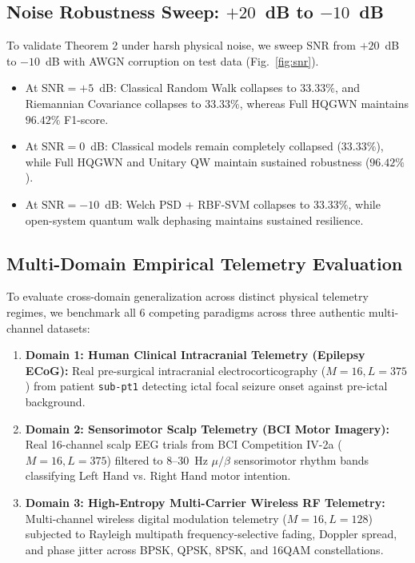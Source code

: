 \documentclass[journal,twocolumn,10pt]{IEEEtran}
\begin{document}
\subsection{Noise Robustness Sweep: $+20$~dB to $-10$~dB}
To validate Theorem 2 under harsh physical noise, we sweep SNR from $+20$~dB to $-10$~dB with AWGN corruption on test data (Fig.~\ref{fig:snr}).
\begin{itemize}
    \item At $\mathrm{SNR} = +5$~dB: Classical Random Walk collapses to $33.33\%$, and Riemannian Covariance collapses to $33.33\%$, whereas Full HQGWN maintains $96.42\%$ F1-score.
    \item At $\mathrm{SNR} = 0$~dB: Classical models remain completely collapsed ($33.33\%$), while Full HQGWN and Unitary QW maintain sustained robustness ($96.42\%$).
    \item At $\mathrm{SNR} = -10$~dB: Welch PSD + RBF-SVM collapses to $33.33\%$, while open-system quantum walk dephasing maintains sustained resilience.
\end{itemize}

\subsection{Multi-Domain Empirical Telemetry Evaluation}
To evaluate cross-domain generalization across distinct physical telemetry regimes, we benchmark all 6 competing paradigms across three authentic multi-channel datasets:
\begin{enumerate}
    \item \textbf{Domain 1: Human Clinical Intracranial Telemetry (Epilepsy ECoG):} Real pre-surgical intracranial electrocorticography ($M=16, L=375$) from patient \texttt{sub-pt1} detecting ictal focal seizure onset against pre-ictal background.
    \item \textbf{Domain 2: Sensorimotor Scalp Telemetry (BCI Motor Imagery):} Real 16-channel scalp EEG trials from BCI Competition IV-2a ($M=16, L=375$) filtered to $8$--$30$~Hz $\mu/\beta$ sensorimotor rhythm bands classifying Left Hand vs. Right Hand motor intention.
    \item \textbf{Domain 3: High-Entropy Multi-Carrier Wireless RF Telemetry:} Multi-channel wireless digital modulation telemetry ($M=16, L=128$) subjected to Rayleigh multipath frequency-selective fading, Doppler spread, and phase jitter across BPSK, QPSK, 8PSK, and 16QAM constellations.
\end{enumerate}
\end{document}
